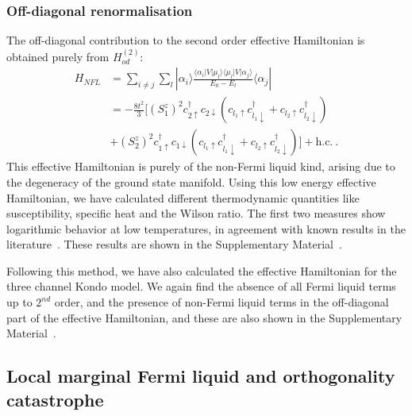 \documentclass{iopart}
\begin{document}
\subsubsection{Off-diagonal renormalisation}
The off-diagonal contribution to the second order effective Hamiltonian is obtained purely from \(H^{(2)}_{od}\):
\begin{eqnarray}
	H_{NFL} &= \sum_{i\neq j} \sum_l |\alpha_i\rangle \frac{\langle \alpha_i  | V| \mu_l \rangle \langle \mu_l  | V| \alpha_j \rangle}{E_0-E_{l}}\langle \alpha_j | \nonumber\\
			       &= -\frac{8t^2}{3} [ (S_1^z)^2 c_{2\uparrow}^{\dagger}c_{2\downarrow}  (  c_{l_1\uparrow}c_{l_1\downarrow}^{\dagger} +  c_{l_2\uparrow}c_{l_2\downarrow}^{\dagger}  ) \nonumber\\
&+ (S_2^z)^2 c_{1\uparrow}^{\dagger}c_{1\downarrow}  (  c_{l_1\uparrow}c_{l_1\downarrow}^{\dagger} +  c_{l_2\uparrow}c_{l_2\downarrow}^{\dagger}  ) ] + \textrm{h.c.} ~.
\label{eq:hamiltonian_NFL}
\end{eqnarray}
This effective Hamiltonian is purely of the non-Fermi liquid kind, arising due to the degeneracy of the ground state manifold. Using this low energy effective Hamiltonian, we have calculated different thermodynamic quantities like susceptibility, specific heat and the Wilson ratio. The first two measures show logarithmic behavior at low temperatures, in agreement with known results in the literature~\cite{Noz_blandin_1980,Gan_Andrei_Coleman_1993,emery_kivelson,Gan_mchannel_1994,
Tsvelick_Weigmann_mchannel_1984,Tsvelick_weigmann_mchannel_1985,parcollet_olivier_large_N,
kimura_taro_Su_N_kondo,PhysRevB.73.224445,cox_jarrell_two_channel_rev,affleck_1991_overscreen,
Coleman_tsvelik,affleck1993exact,coleman_pepin_2003,roch_nicolas_costi_2009,schiller_avraham_2008,
Durganandini_2011}. These results are shown in the Supplementary Material~\cite{SM}. 

Following this method, we have also calculated the effective Hamiltonian for the three channel Kondo model. We again find the absence of all Fermi liquid terms up to $2^{nd}$ order, and the presence of non-Fermi liquid terms in the off-diagonal part of the effective Hamiltonian, and these are also shown in the Supplementary Material~\cite{SM}.

\subsection{Local marginal Fermi liquid and orthogonality catastrophe}
\label{sec:MFL}
\end{document}
